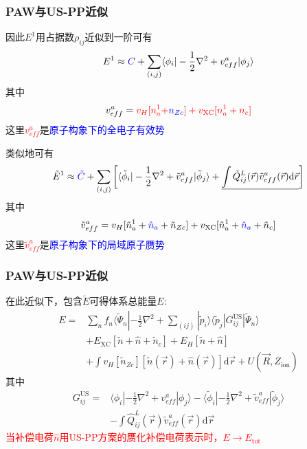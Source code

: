 \documentclass[cjk,slidestop,compress,mathserif,blue]{beamer}
\begin{document}
\frame
{
	\frametitle{\textrm{PAW}与\textrm{US-PP}近似}
	因此$E^1$用占据数$\rho_{ij}$近似到一阶可有
	\begin{displaymath}
		E^1\approx\textcolor{blue}{C}+\sum_{(i,j)}\langle\phi_i|-\frac12\nabla^2+v_{eff}^a|\phi_j\rangle
	\end{displaymath}
	其中
	\begin{displaymath}
		v_{eff}^a=\textcolor{red}{v_H[n_a^1+}\textcolor{blue}{n_{Zc}}\textcolor{red}{]+v_{\mathrm{XC}}[n_a^1+n_c]}
	\end{displaymath}
	这里\textcolor{red}{$v_{eff}^a$}是\textcolor{blue}{原子构象下的全电子有效势}

	类似地可有
	\begin{displaymath}
		\tilde E^1\approx\textcolor{blue}{\tilde C}+\sum_{(i,j)}\left[\langle\tilde\phi_i|-\frac12\nabla^2+\tilde v_{eff}^a|\tilde\phi_j\rangle+\underline{\int\tilde Q_{ij}^L(\vec r)\tilde v_{eff}^a(\vec r)\mathrm{d}\vec r}\right]
	\end{displaymath}
	其中$$\tilde v_{eff}^a=v_H[\tilde n_a^1+\textcolor{blue}{\hat n_a}+\tilde n_{Zc}]+v_{\mathrm{XC}}[\tilde n_a^1+\textcolor{blue}{\hat n_a}+\tilde n_c]$$
	这里\textcolor{red}{$\tilde v_{eff}^a$}是\textcolor{blue}{原子构象下的局域原子赝势}
}

\frame
{
	\frametitle{\textrm{PAW}与\textrm{US-PP}近似}
	在此近似下，包含$\tilde E$可得体系总能量$E$:
	\begin{displaymath}
		\begin{aligned}
			E=&\sum_nf_n\langle\tilde\Psi_n|-\frac12\nabla^2+\sum_{(ij)}|\tilde p_i\rangle\langle\tilde p_j|G_{ij}^{\mathrm{US}}|\tilde\Psi_n\rangle\\
			&+E_{\mathrm{XC}}[\tilde n+\hat n+\tilde n_c]+E_H[\tilde n+\hat n]\\
			&+\int v_H[\tilde n_{Zc}][\tilde n(\vec r)+\hat n(\vec r)]\mathrm{d}\vec r+U(\vec R,Z_{\mathrm{ion}})
		\end{aligned}
	\end{displaymath}
	其中
	\begin{displaymath}
		\begin{aligned}
			G_{ij}^{\mathrm{US}}=&\langle\phi_i|-\frac12\nabla^2+v_{eff}^a|\phi_j\rangle-\langle\tilde\phi_i|-\frac12\nabla^2+\tilde v_{eff}^a|\tilde\phi_j\rangle\\
			&-\int\hat Q_{ij}^L(\vec r)\tilde v_{eff}^a(\vec r)\mathrm{d}\vec r
		\end{aligned}
	\end{displaymath}
	\textcolor{red}{当补偿电荷$\hat n$用\textrm{US-PP}方案的赝化补偿电荷表示时，$E\rightarrow E_{\mathrm{tot}}$}
}
\end{document}
